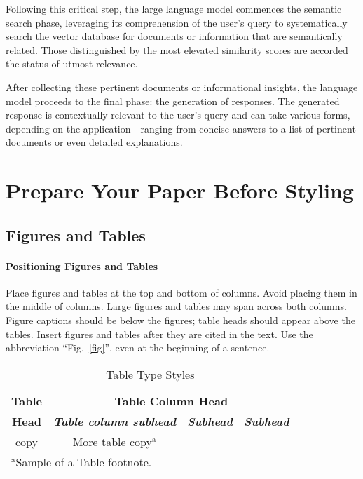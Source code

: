\documentclass[conference]{IEEEtran}
\begin{document}
Following this critical step, the large language model commences the semantic search phase, leveraging its comprehension of the user's query to systematically search the vector database for documents or information that are semantically related. Those distinguished by the most elevated similarity scores are accorded the status of utmost relevance.

After collecting these pertinent documents or informational insights, the language model proceeds to the final phase: the generation of responses. The generated response is contextually relevant to the user's query and can take various forms, depending on the application—ranging from concise answers to a list of pertinent documents or even detailed explanations.



\section{Prepare Your Paper Before Styling}

\subsection{Figures and Tables}
\paragraph{Positioning Figures and Tables} Place figures and tables at the top and 
bottom of columns. Avoid placing them in the middle of columns. Large 
figures and tables may span across both columns. Figure captions should be 
below the figures; table heads should appear above the tables. Insert 
figures and tables after they are cited in the text. Use the abbreviation 
``Fig.~\ref{fig}'', even at the beginning of a sentence.

\begin{table}[htbp]
\caption{Table Type Styles}
\begin{center}
\begin{tabular}{|c|c|c|c|}
\hline
\textbf{Table}&\multicolumn{3}{|c|}{\textbf{Table Column Head}} \\
\cline{2-4} 
\textbf{Head} & \textbf{\textit{Table column subhead}}& \textbf{\textit{Subhead}}& \textbf{\textit{Subhead}} \\
\hline
copy& More table copy$^{\mathrm{a}}$& &  \\
\hline
\multicolumn{4}{l}{$^{\mathrm{a}}$Sample of a Table footnote.}
\end{tabular}
\label{tab1}
\end{center}
\end{table}
\end{document}
